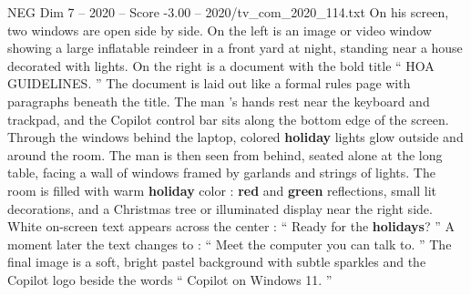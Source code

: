 \begin{textsample}{NEG Dim 7 – 2020 – Score -3.00 – 2020/tv\_com\_2020\_114.txt}
On his screen, two windows are open side by side.
On the left is an image or video window showing a large inflatable reindeer in a front yard at night, standing near a house decorated with lights.
On the right is a document with the bold title “ HOA GUIDELINES. ” The document is laid out like a formal rules page with paragraphs beneath the title.
The man ’s hands rest near the keyboard and trackpad, and the Copilot control bar sits along the bottom edge of the screen.
Through the windows behind the laptop, colored \textbf{holiday} lights glow outside and around the room.
The man is then seen from behind, seated alone at the long table, facing a wall of windows framed by garlands and strings of lights.
The room is filled with warm \textbf{holiday} color : \textbf{red} and \textbf{green} reflections, small lit decorations, and a Christmas tree or illuminated display near the right side.
White on-screen text appears across the center : “ Ready for the \textbf{holidays}? ” A moment later the text changes to : “ Meet the computer you can talk to. ” The final image is a soft, bright pastel background with subtle sparkles and the Copilot logo beside the words “ Copilot on Windows 11. ”

\end{textsample}
